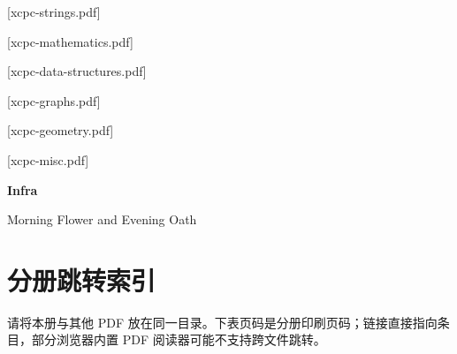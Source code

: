 

\makeindex[noautomatic,title=用途索引,columns=3]


[xcpc-strings.pdf]

[xcpc-mathematics.pdf]

[xcpc-data-structures.pdf]

[xcpc-graphs.pdf]

[xcpc-geometry.pdf]

[xcpc-misc.pdf]



\raggedbottom

\hypersetup{pageanchor=false}

\begin{titlepage}\centering\vspace*{35mm}

{\Huge\bfseries Infra\par}\vspace{15mm}

{\LARGE Morning Flower and Evening Oath\par}\vspace{15mm}

\vfill

\end{titlepage}\hypersetup{pageanchor=true}

\frontmatter{\footnotesize\tableofcontents}

\mainmatter



\newpage\section{分册跳转索引}\label{infra-links}

请将本册与其他 PDF 放在同一目录。下表页码是分册印刷页码；链接直接指向条目，部分浏览器内置 PDF 阅读器可能不支持跨文件跳转。

